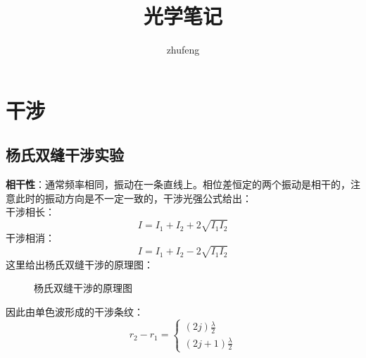 \documentclass[UFT8]{article}
\begin{document}
\kaishu
\title{光学笔记}
\author{zhufeng}
\date{}
\maketitle
\thispagestyle{empty}
\newpage
\tableofcontents
\newpage
{}%
\thispagestyle{empty}
\setcounter{page}{1}
\section{干涉}
\subsection{杨氏双缝干涉实验}
\textbf{相干性}：通常频率相同，振动在一条直线上。相位差恒定的两个振动是相干的，注意此时的振动方向是不一定一致的，干涉光强公式给出：\\
干涉相长：
\[
	I=I_1+I_2+2\sqrt{I_1I_2}
\]
干涉相消：
\[
	I=I_1+I_2-2\sqrt{I_1I_2}
\]
这里给出杨氏双缝干涉的原理图：
\begin{figure}[htpb]
\begin{center}
\end{center}
\caption{杨氏双缝干涉的原理图}
\end{figure}

因此由单色波形成的干涉条纹：
\begin{equation*}
r_2-r_1=
\begin{cases}
(2j)\frac{\lambda}{2}\\
(2j+1)\frac{\lambda}{2}
\end{cases}
\end{equation*}
\end{document}
